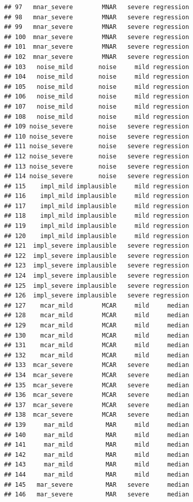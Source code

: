 \documentclass[
]{article}
\begin{document}
\begin{verbatim}
## 97   mnar_severe        MNAR   severe regression
## 98   mnar_severe        MNAR   severe regression
## 99   mnar_severe        MNAR   severe regression
## 100  mnar_severe        MNAR   severe regression
## 101  mnar_severe        MNAR   severe regression
## 102  mnar_severe        MNAR   severe regression
## 103   noise_mild       noise     mild regression
## 104   noise_mild       noise     mild regression
## 105   noise_mild       noise     mild regression
## 106   noise_mild       noise     mild regression
## 107   noise_mild       noise     mild regression
## 108   noise_mild       noise     mild regression
## 109 noise_severe       noise   severe regression
## 110 noise_severe       noise   severe regression
## 111 noise_severe       noise   severe regression
## 112 noise_severe       noise   severe regression
## 113 noise_severe       noise   severe regression
## 114 noise_severe       noise   severe regression
## 115    impl_mild implausible     mild regression
## 116    impl_mild implausible     mild regression
## 117    impl_mild implausible     mild regression
## 118    impl_mild implausible     mild regression
## 119    impl_mild implausible     mild regression
## 120    impl_mild implausible     mild regression
## 121  impl_severe implausible   severe regression
## 122  impl_severe implausible   severe regression
## 123  impl_severe implausible   severe regression
## 124  impl_severe implausible   severe regression
## 125  impl_severe implausible   severe regression
## 126  impl_severe implausible   severe regression
## 127    mcar_mild        MCAR     mild     median
## 128    mcar_mild        MCAR     mild     median
## 129    mcar_mild        MCAR     mild     median
## 130    mcar_mild        MCAR     mild     median
## 131    mcar_mild        MCAR     mild     median
## 132    mcar_mild        MCAR     mild     median
## 133  mcar_severe        MCAR   severe     median
## 134  mcar_severe        MCAR   severe     median
## 135  mcar_severe        MCAR   severe     median
## 136  mcar_severe        MCAR   severe     median
## 137  mcar_severe        MCAR   severe     median
## 138  mcar_severe        MCAR   severe     median
## 139     mar_mild         MAR     mild     median
## 140     mar_mild         MAR     mild     median
## 141     mar_mild         MAR     mild     median
## 142     mar_mild         MAR     mild     median
## 143     mar_mild         MAR     mild     median
## 144     mar_mild         MAR     mild     median
## 145   mar_severe         MAR   severe     median
## 146   mar_severe         MAR   severe     median

\end{verbatim}
\end{document}

